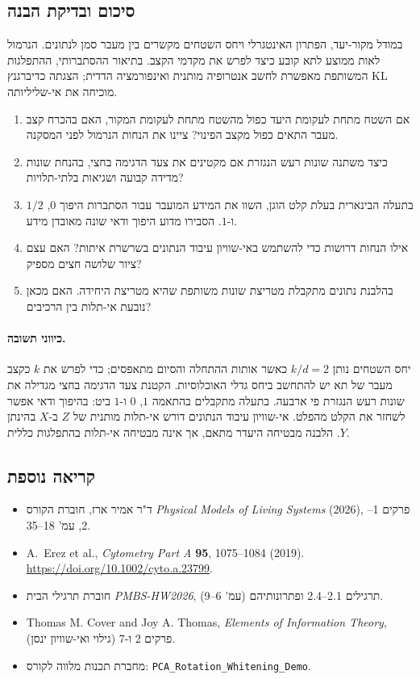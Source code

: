 \subsection*{סיכום ובדיקת הבנה}
במודל מקור-יעד, הפתרון האינטגרלי ויחס השטחים מקשרים בין מעבר סמן לנתונים. הנרמול לאות ממוצע לתא קובע כיצד לפרש את מקדמי הקצב. בתיאור ההסתברותי, ההתפלגות המשותפת מאפשרת לחשב אנטרופיה מותנית ואינפורמציה הדדית; הצגתה כדיברגנץ KL מוכיחה את אי-שליליותה.
\begin{enumerate}
\item אם השטח מתחת לעקומת היעד כפול מהשטח מתחת לעקומת המקור, האם בהכרח קצב מעבר התאים כפול מקצב הפינוי? ציינו את הנחות הנרמול לפני המסקנה.
\item כיצד משתנה שונות רעש הנגזרת אם מקטינים את צעד הדגימה בחצי, בהנחת שונות מדידה קבועה ושגיאות בלתי-תלויות?
\item בתעלה הבינארית בעלת קלט הוגן, השוו את המידע המועבר עבור הסתברות היפוך $0$, $1/2$ ו-$1$. הסבירו מדוע היפוך ודאי שונה מאובדן מידע.
\item אילו הנחות דרושות כדי להשתמש באי-שוויון עיבוד הנתונים בשרשרת איתות? האם עצם ציור שלושה חצים מספיק?
\item בהלבנת נתונים מתקבלת מטריצת שונות משותפת שהיא מטריצת היחידה. האם מכאן נובעת אי-תלות בין הרכיבים?
\end{enumerate}
\paragraph{כיווני תשובה.}
יחס השטחים נותן $k/d=2$ כאשר אותות ההתחלה והסיום מתאפסים; כדי לפרש את $k$ כקצב מעבר של תא יש להתחשב ביחס גדלי האוכלוסיות. הקטנת צעד הדגימה בחצי מגדילה את שונות רעש הנגזרת פי ארבעה. בתעלה מתקבלים בהתאמה $1$, $0$ ו-$1$ ביט: בהיפוך ודאי אפשר לשחזר את הקלט מהפלט. אי-שוויון עיבוד הנתונים דורש אי-תלות מותנית של $Z$ ב-$X$ בהינתן $Y$. הלבנה מבטיחה היעדר מתאם, אך אינה מבטיחה אי-תלות בהתפלגות כללית.

\subsection*{קריאה נוספת}
\begingroup\small
\begin{itemize}
\item ד"ר אמיר ארז, חוברת הקורס \emph{Physical Models of Living Systems} (2026), פרקים 1--2, עמ' 18--35.
\item \textenglish{A.~Erez et al., \emph{Cytometry Part A} \textbf{95}, 1075--1084 (2019).}\\
\textenglish{\url{https://doi.org/10.1002/cyto.a.23799}}.
\item חוברת תרגילי הבית \emph{PMBS-HW2026}, תרגילים 2.1--2.4 ופתרונותיהם (עמ' 6--9).
\item Thomas M. Cover and Joy A. Thomas, \emph{Elements of Information Theory}, פרקים 2 ו-7 (גילוי ואי-שוויון ינסן).
\item מחברת תכנות מלווה לקורס: \textenglish{\texttt{PCA\_Rotation\_Whitening\_Demo}}.
\end{itemize}
\endgroup

